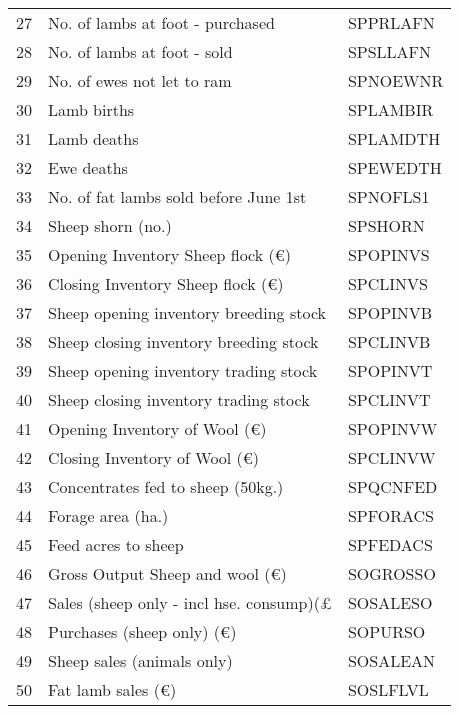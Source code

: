 \documentclass{article}\usepackage{graphicx, color}
\begin{document}
\begin{flushleft}
\begin{table}[ht]
\begin{center}
\begin{tabular}{rll}
  27 & No. of lambs at foot - purchased & SPPRLAFN \\ 
  28 & No. of lambs at foot - sold & SPSLLAFN \\ 
  29 & No. of ewes not let to ram & SPNOEWNR \\ 
  30 & Lamb births & SPLAMBIR \\ 
  31 & Lamb deaths & SPLAMDTH \\ 
  32 & Ewe deaths & SPEWEDTH \\ 
  33 & No. of fat lambs sold before June 1st & SPNOFLS1 \\ 
  34 & Sheep shorn             (no.) & SPSHORN \\ 
  35 & Opening Inventory Sheep flock   (€) & SPOPINVS \\ 
  36 & Closing Inventory Sheep flock   (€) & SPCLINVS \\ 
  37 & Sheep opening inventory breeding stock & SPOPINVB \\ 
  38 & Sheep closing inventory breeding stock & SPCLINVB \\ 
  39 & Sheep opening inventory trading stock & SPOPINVT \\ 
  40 & Sheep closing inventory trading stock & SPCLINVT \\ 
  41 & Opening Inventory of Wool (€) & SPOPINVW \\ 
  42 & Closing Inventory of Wool (€) & SPCLINVW \\ 
  43 & Concentrates fed to sheep (50kg.) & SPQCNFED \\ 
  44 & Forage area (ha.) & SPFORACS \\ 
  45 & Feed acres to sheep & SPFEDACS \\ 
  46 & Gross Output Sheep and wool (€) & SOGROSSO \\ 
  47 & Sales (sheep only - incl hse. consump)(£ & SOSALESO \\ 
  48 & Purchases (sheep only)   (€) & SOPURSO \\ 
  49 & Sheep sales (animals only) & SOSALEAN \\ 
  50 & Fat lamb sales           (€) & SOSLFLVL \\ 
   \hline
\end{tabular}
\end{center}
\end{table}



\end{flushleft}
\end{document}
